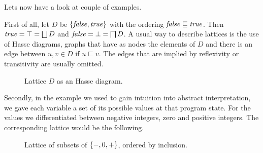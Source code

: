 \documentclass[..thesis.tex]{subfiles}
\begin{document}

Lets now have a look at couple of examples. 

First of all, let $D$ be $\left\lbrace \mathit{false}, \mathit{true} \right\rbrace$ with the ordering $\mathit{false} \sqsubseteq \mathit{true}$.
Then $\mathit{true} = \top = \bigsqcup D$ and $\mathword{false} = \bot = \bigsqcap D$. A usual way to describe lattices is the use of Hasse diagrams,
graphs that have as nodes the elements of $D$ and there is an edge between $u, v \in D$ if $u \sqsubseteq v$.
The edges that are implied by reflexivity or transitivity are usually omitted.

\begin{figure}[H]
  \begin{center}
  \end{center}
  \caption{Lattice $D$ as an Hasse diagram.}
\end{figure}
 
Secondly, in the example we used to gain intuition into abstract interpretation, we gave each variable a set of its possible values at that program state.
For the values we differentiated between negative integers, zero and positive integers. The corresponding lattice would be the following.


\begin{figure}[H]
  \begin{center}
  \end{center}
  \caption{Lattice of subsets of ${\left\lbrace -, 0, + \right\rbrace}$, ordered by inclusion.}
\end{figure}
\end{document}
